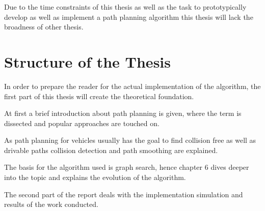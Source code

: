 Due to the time constraints of this thesis as well as the task to prototypically develop as well as implement a path planning algorithm this thesis will lack the broadness of other thesis.

\section{Structure of the Thesis}
In order to prepare the reader for the actual implementation of the algorithm, the first part of this thesis will create the theoretical foundation.

At first a brief introduction about path planning is given, where the term is dissected and popular approaches are touched on.

As path planning for vehicles usually has the goal to find collision free as well as drivable paths collision detection and path smoothing are explained.

The basis for the algorithm used is graph search, hence chapter 6 dives deeper into the topic and explains the evolution of the algorithm.

The second part of the report deals with the implementation simulation and results of the work conducted.